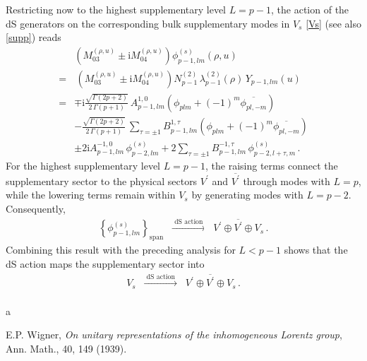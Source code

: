 \documentclass[aps,twocolumn,nofootinbib]{revtex4}
\begin{document}
{\begin{appendix}
Restricting now to the highest supplementary level $L=p-1$, the action of the dS generators on the corresponding bulk supplementary modes in $V_s$ \eqref{Vs} (see also \eqref{supp}) reads
\begin{align}
    &\!\!\!\!\!\!\!\left(M_{03}^{(\rho, u)} \pm \mathrm{i}M_{04}^{(\rho, u)}\right) \phi^{(s)}_{p-1,lm}(\rho,u) \nonumber\\[3pt]
    =&\, \left(M_{03}^{(\rho, u)} \pm \mathrm{i} M_{04}^{(\rho, u)}\right) N^{(2)}_{p-1}\,\lambda_{p-1}^{(2)}(\rho)\,Y^{}_{p-1,lm}(u) \nonumber\\[3pt]
    =& \mp \mathrm{i} \frac{\sqrt{\Gamma(2p+2)}}{2\, \Gamma(p+1)} \, A^{1,0}_{p-1, lm} \left( \phi^{}_{plm} + (-1)^m \overline{\phi^{}_{pl,-m}} \right) \nonumber\\[3pt]
    & - \frac{\sqrt{\Gamma(2p+2)}}{2\, \Gamma(p+1)} \, \sum_{\tau=\pm 1} B^{1,\tau}_{p-1, lm} \left( \phi^{}_{plm} + (-1)^m \overline{\phi^{}_{pl,-m}} \right) \nonumber\\[3pt]
    & \pm 2\mathrm{i} A^{-1,0}_{p-1, lm}\, \phi^{(s)}_{p-2,lm} + 2 \sum_{\tau=\pm 1} \! B^{-1,\tau}_{p-1, lm} \, \phi^{(s)}_{p-2, l+\tau, m}  \,.
\end{align}
For the highest supplementary level $L=p-1$, the raising terms connect the supplementary sector to the physical sectors $V^\prime$ and $\overline{V^\prime}$ through modes with $L=p$, while the lowering terms remain within $V_s$ by generating modes with $L=p-2$. Consequently,
\begin{align}
    \left\{\phi^{(s)}_{p-1,lm}\right\}_{\mathrm{span}} \;\;\xrightarrow[]{\text{ dS action }}\;\; V^\prime \oplus \overline{V^\prime} \oplus V_s \,.
\end{align}
Combining this result with the preceding analysis for $L<p-1$ shows that the dS action maps the supplementary sector into
\begin{align}
    V_s \;\;\xrightarrow[]{\text{ dS action }}\;\; V^\prime \oplus \overline{V^\prime} \oplus V_s \,.
\end{align}  

\end{appendix}


\begin{thebibliography}{a}

 E.P. Wigner, \emph{On unitary representations of the inhomogeneous Lorentz group}, Ann. Math., 40, 149 (1939).


\end{thebibliography}}
\end{document}
